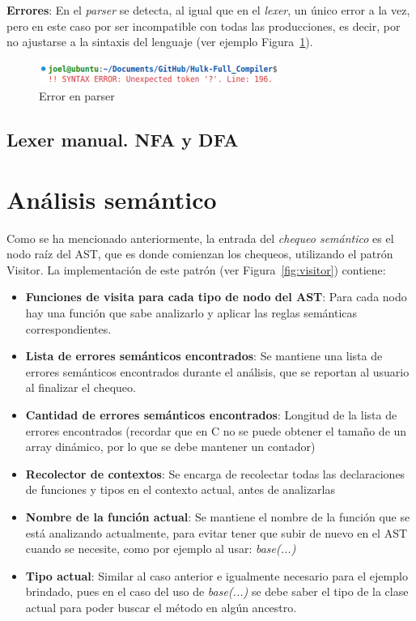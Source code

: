 \documentclass{llncs}
\begin{document}
\textbf{Errores}: En el \textit{parser} se detecta, al igual que en el \textit{lexer}, un único error a la vez, pero en este caso por ser incompatible con todas las producciones, es decir, por no ajustarse a la sintaxis del lenguaje (ver ejemplo Figura~\ref{fig:errores_yacc}).
\begin{figure}[h]
\centering
\includegraphics[width=0.7\textwidth]{images/parser_errors.png}
\caption{Error en parser}
\label{fig:errores_yacc}
\end{figure}

\subsection{Lexer manual. NFA y DFA}

\vspace{10pt}
\section{Análisis semántico}

Como se ha mencionado anteriormente, la entrada del \textit{chequeo semántico} es el nodo raíz del AST, que es donde comienzan los chequeos, utilizando el
patrón Visitor. La implementación de este patrón (ver Figura~\ref{fig:visitor}) contiene: 
\begin{itemize}
    \item \textbf{Funciones de visita para cada tipo de nodo del AST}: Para cada nodo hay una función que sabe analizarlo y aplicar las reglas semánticas correspondientes.
    \item \textbf{Lista de errores semánticos encontrados}: Se mantiene una lista de errores semánticos encontrados durante el análisis, que se reportan al usuario al finalizar el chequeo.
    \item \textbf{Cantidad de errores semánticos encontrados}: Longitud de la lista de errores encontrados (recordar que en C no se puede obtener el tamaño de un array dinámico, por lo que se debe mantener un contador)
    \item \textbf{Recolector de contextos}: Se encarga de recolectar todas las declaraciones de funciones y tipos en el contexto actual, antes de analizarlas
    \item \textbf{Nombre de la función actual}: Se mantiene el nombre de la función que se está analizando actualmente, para evitar tener que subir de nuevo en el AST cuando se necesite, como por ejemplo al usar: \textit{base(...)}
    \item \textbf{Tipo actual}: Similar al caso anterior e igualmente necesario para el ejemplo brindado, pues en el caso del uso de \textit{base(...)} se debe saber el tipo de la clase actual para poder buscar el método en algún ancestro.
\end{itemize}
\end{document}
